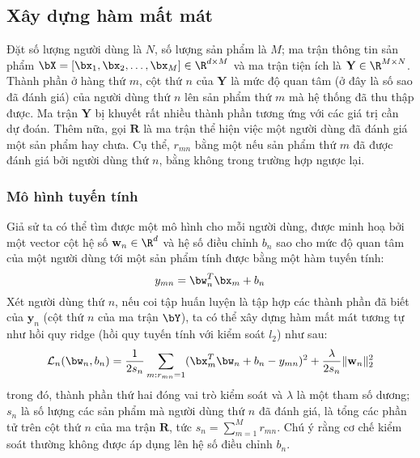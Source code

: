 \subsection{Xây dựng hàm mất mát}

Đặt số lượng người dùng là $N$, số lượng sản phẩm là $M$; ma
trận thông tin sản phẩm $\bX = [\bx_1, \bx_2, \dots, \bx_M] \in\R^{d\times M}$ và ma
trận tiện ích là $\mathbf{Y} \in \R^{M \times N}$. Thành phần ở hàng thứ $m$, cột
thứ $n$ của $\mathbf{Y}$ là {mức độ quan tâm} (ở đây là số sao đã
đánh giá) của người dùng thứ $n$ lên sản phẩm thứ $m$ mà hệ thống
đã thu
thập được. Ma trận $\mathbf{Y}$ bị khuyết rất nhiều thành phần tương ứng với các
giá trị cần dự đoán. Thêm nữa, gọi $\mathbf{R}$ là ma trận thể hiện việc một người dùng đã đánh giá một
sản phẩm hay chưa. Cụ thể, $r_{mn}$ bằng một nếu sản phẩm thứ $m$ đã
được đánh giá bởi người dùng thứ $n$, bằng không trong trường hợp ngược
lại.

\subsubsection{Mô hình tuyến tính}

Giả sử ta có thể tìm được một mô hình cho mỗi người dùng, được minh hoạ
bởi một vector cột hệ số $\mathbf{w}_n \in \R^d$ và hệ số điều chỉnh $b_n$ sao cho
{mức độ quan tâm} của một người dùng tới một sản phẩm tính
được bằng một hàm tuyến tính:
\begin{equation}
\label{eqn:23_1_a}
y_{mn} = \bw_n^T\bx_m + b_n
\end{equation}
Xét người dùng thứ $n$, nếu coi tập huấn luyện là tập hợp các
thành phần đã biết của $\mathbf{y}_n$ (cột thứ $n$ của ma
trận $\bY$), ta có thể xây dựng hàm mất
mát tương tự như hồi quy {ridge} (hồi quy tuyến tính với kiểm soát $l_2$) như sau:
\begin{equation}
\label{eqn:23_1}
\mathcal{L}_n(\bw_n, b_n) = \frac{1}{2s_n} \sum_{m:r_{mn} = 1}(\bx_m^T\bw_n +
b_n
- y_{mn})^2
+ \frac{\lambda}{2s_n} \|\mathbf{w}_n\|_2^2
\end{equation}
trong đó, thành phần thứ hai đóng vai trò kiểm soát và $\lambda$ là một tham số
dương; $s_n$ là số lượng các sản phẩm mà người dùng thứ $n$ đã đánh giá,
là tổng các phần tử trên cột thứ $n$ của ma trận $\mathbf{R}$, tức $s_n =
\sum_{m=1}^M r_{mn}$. Chú ý rằng cơ chế kiểm soát thường không được áp dụng lên
hệ số điều chỉnh $b_n$.


